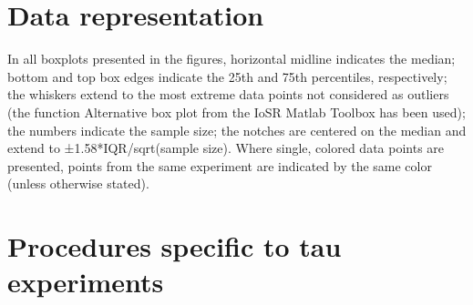 \section{Data representation}
In all boxplots presented in the figures, horizontal midline indicates the median; bottom and top box edges indicate the 25th and 75th percentiles, respectively; the whiskers extend to the most extreme data points not considered as outliers (the function Alternative box plot from the IoSR Matlab Toolbox has been used); the numbers indicate the sample size; the notches are centered on the median and extend to ±1.58*IQR/sqrt(sample size). Where single, colored data points are presented, points from the same experiment are indicated by the same color (unless otherwise stated). 

\section{Procedures specific to tau experiments}

